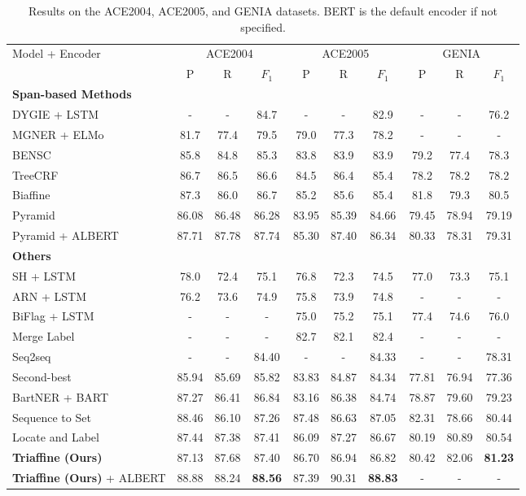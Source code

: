 \documentclass[11pt]{article}
\begin{document}
\begin{table*}[ht]
\small
\centering
\begin{tabular}{lccccccccc}
\toprule
Model + Encoder & \multicolumn{3}{c}{ACE2004} & \multicolumn{3}{c}{ACE2005} & \multicolumn{3}{c}{GENIA} \\
& P & R & $F_1$ & P & R & $F_1$& P & R & $F_1$  \\
\midrule
\bf{Span-based Methods} \\
DYGIE \cite{dygie} + LSTM & - & - & 84.7 & - & - & 82.9 & - & - & 76.2 \\
MGNER \cite{mgner} + ELMo & 81.7 & 77.4 & 79.5 & 79.0 & 77.3 & 78.2 & - & - & -  \\
BENSC \cite{bensc} & 85.8 & 84.8 & 85.3 & 83.8 & 83.9 & 83.9 & 79.2 & 77.4 & 78.3  \\
TreeCRF \cite{fu2021nested}  & 86.7 & 86.5 & 86.6 & 84.5 & 86.4 & 85.4 & 78.2 & 78.2 & 78.2 \\
Biaffine \cite{yu2020named}  & 87.3 & 86.0 & 86.7 & 85.2 & 85.6 & 85.4 & 81.8 & 79.3 & 80.5 \\
Pyramid \cite{wang2020pyramid}  & 86.08 & 86.48 & 86.28 & 83.95 & 85.39 & 84.66 & 79.45 & 78.94 & 79.19 \\
Pyramid \cite{wang2020pyramid} + ALBERT & 87.71 & 87.78 & 87.74 & 85.30 & 87.40 & 86.34 & 80.33 & 78.31 & 79.31 \\
\midrule
\bf{Others} \\
SH \cite{sh} + LSTM & 78.0 & 72.4 & 75.1 & 76.8 & 72.3 & 74.5 & 77.0 & 73.3 & 75.1 \\
ARN \cite{lin2019sequence} + LSTM & 76.2 & 73.6 & 74.9 & 75.8 & 73.9 & 74.8 & - & - & - \\
BiFlag \cite{luo2020bipartite} + LSTM & - & - & - & 75.0 & 75.2 & 75.1 & 77.4 & 74.6 & 76.0 \\
Merge Label \cite{mergelabel} & - & - & - & 82.7 & 82.1 & 82.4 & - & - & - \\
Seq2seq \cite{strakova2019neural} & - & - & 84.40 & - & - & 84.33 & - & - & 78.31 \\
Second-best \cite{second} & 85.94 & 85.69 & 85.82 & 83.83 & 84.87 & 84.34 & 77.81 & 76.94 & 77.36 \\
BartNER \cite{bartner} + BART  & 87.27 & 86.41 & 86.84 & 83.16 & 86.38 & 84.74 & 78.87 & 79.60 & 79.23 \\
Sequence to Set \cite{tan2021sequence}   & 88.46 & 86.10 & 87.26 & 87.48 & 86.63 & 87.05 & 82.31 & 78.66 & 80.44 \\
Locate and Label \cite{shen2021locate}  & 87.44 & 87.38 & 87.41 & 86.09 & 87.27 & 86.67 & 80.19 & 80.89 & 80.54 \\
\midrule
{\bf Triaffine (Ours)} & 87.13 & 87.68 & 87.40 & 86.70 & 86.94 & 86.82 & 80.42 & 82.06 & \textbf{81.23} \\
{\bf Triaffine (Ours)} + ALBERT & 88.88 & 88.24 & \textbf{88.56} & 87.39 & 90.31 & \textbf{88.83} & - & - & - \\
\bottomrule
\end{tabular}
\caption{Results on the ACE2004, ACE2005, and GENIA datasets. BERT is the default encoder if not specified.}
\label{main results}
\end{table*}
\end{document}
